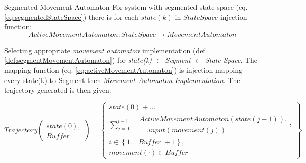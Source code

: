 \begin{definition}{Segmented Movement Automaton}\label{def:segmentedMovementAutomaton}
    For system with segmented state space (eq. \ref{eq:segmentedStateSpace}) there is for each $state(k)$ in $StateSpace$ injection function:
    \begin{equation} \label{eq:activeMovementAutomaton}
        ActiveMovementAutomaton:StateSpace\to MovementAutomaton
    \end{equation}
    
\noindent Selecting appropriate \emph{movement automaton} implementation (def. \ref{def:segmentMovementAutomaton}) for \emph{state(k)} $\in$ \emph{Segment} $\subset$ \emph{State Space}. The mapping function (eq. \ref{eq:activeMovementAutomaton}) is injection mapping every state(k) to Segment then \emph{Movement Automaton Implementation}. The trajectory generated is then given:
    
    \begin{equation}\label{eq:ourTrajectoryImplementationSegmented}
        Trajectory\left(\begin{gathered}state(0),\\Buffer\end{gathered}\right)= 
        \left\{
            \begin{gathered}
                state(0)+\dots\\\sum_{j=0}^{i-1} 
                    \begin{aligned} 
                        &ActiveMovementAutomaton(state(j-1)).\\
                        &\quad.input(movement(j))
                    \end{aligned}:\\
                i \in\left\{1\dots |Buffer|+1\right\}, \\
                movement(\cdot) \in Buffer
            \end{gathered}
        \right\}
    \end{equation}
    
\end{definition}


